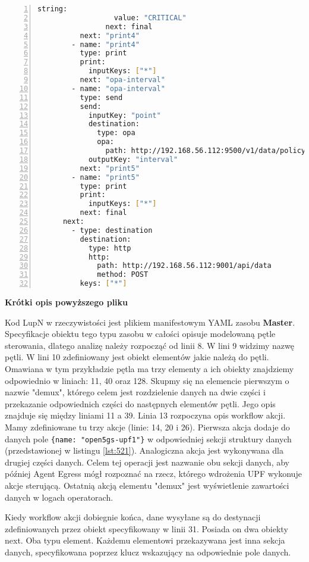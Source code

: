 \begin{lstlisting}[language=sh, caption={\emph{Kod LupN}}, label={lst:a101}, numbers=left, stepnumber=1]
                string: 
                  value: "CRITICAL"
                next: final
          next: "print4"
        - name: "print4"
          type: print
          print:
            inputKeys: ["*"]
          next: "opa-interval"
        - name: "opa-interval"
          type: send
          send: 
            inputKey: "point"
            destination: 
              type: opa
              opa: 
                path: http://192.168.56.112:9500/v1/data/policy/interval
            outputKey: "interval"
          next: "print5"
        - name: "print5"
          type: print
          print:
            inputKeys: ["*"]
          next: final
      next: 
        - type: destination
          destination: 
            type: http
            http: 
              path: http://192.168.56.112:9001/api/data
              method: POST
          keys: ["*"]
\end{lstlisting}


\textbf{Krótki opis powyższego pliku}

Kod LupN w rzeczywistości jest plikiem manifestowym YAML zasobu \textbf{Master}. Specyfikacje obiektu tego typu zasobu w całości opisuje modelowaną pętle sterowania, dlatego analizę należy rozpocząć od linii 8. W lini 9 widzimy nazwę pętli. W lini 10 zdefiniowany jest obiekt elementów jakie należą do pętli. Omawiana w tym przykładzie pętla ma trzy elementy a ich obiekty znajdziemy odpowiednio w liniach: 11, 40 oraz 128. Skupmy się na elemencie pierwszym o nazwie "demux", którego celem jest rozdzielenie danych na dwie części i przekazanie odpowiednich części do następnych elementów pętli. Jego opis znajduje się między liniami 11 a 39. Linia 13 rozpoczyna opis workflow akcji. Mamy zdefiniowane tu trzy akcje (linie: 14, 20 i 26). Pierwsza akcja dodaje do danych pole \texttt{\{name: "open5gs-upf1"\}} w odpowiedniej sekcji struktury danych (przedstawionej w listingu \ref{lst:521}). Analogiczna akcja jest wykonywana dla drugiej części danych. Celem tej operacji jest nazwanie obu sekcji danych, aby później Agent Egress mógł rozpoznać na rzecz, którego wdrożenia UPF wykonuje akcje sterującą. Ostatnią akcją elementu "demux" jest wyświetlenie zawartości danych w logach operatorach. 

Kiedy workflow akcji dobiegnie końca, dane wysyłane są do destynacji zdefiniowanych przez obiekt specyfikowany w linii 31. Posiada on dwa obiekty next. Oba typu element. Każdemu elementowi przekazywana jest inna sekcja danych, specyfikowana poprzez klucz wskazujący na odpowiednie pole danych.

